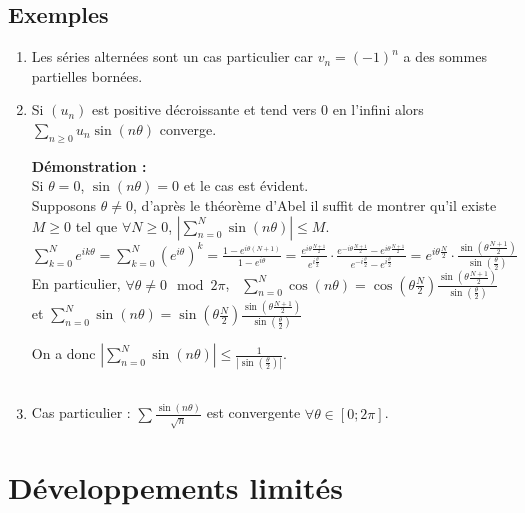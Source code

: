 \documentclass[a4paper,10pt]{book} %
\newcommand{\abs}[1]{\left|#1\right|}
\newcommand{\displayAmath}{\displaystyle}
\begin{document}
\subsection{Exemples}
\begin{enumerate}
\item Les séries alternées sont un cas particulier car $v_n=(-1)^n$ a des sommes partielles bornées.\\

\item Si $(u_n)$ est positive décroissante et tend vers 0 en l'infini alors $\displayAmath \sum_{n\geq 0}u_n\sin(n\theta)$ converge.

\textbf{Démonstration : }\\
Si $\theta=0$, $\sin(n\theta)=0$ et le cas est évident.\\

Supposons $\theta\neq 0$, d'après le théorème d'Abel il suffit de montrer qu'il existe $M\geq 0$ tel que $\forall N\geq 0$, $\displayAmath \abs{\sum_{n=0}^N\sin(n\theta)}\leq M$.\\
$\displayAmath \sum_{k=0}^N e^{ik\theta}=\sum_{k=0}^N(e^{i\theta})^k=\frac{1-e^{i\theta(N+1)}}{1-e^{i\theta}}=\frac{e^{i\theta\frac{N+1}{2}}}{e^{i\frac{\theta}{2}}}\cdot \frac{e^{-i\theta\frac{N+1}{2}}-e^{i\theta\frac{N+1}{2}}}{e^{-i\frac{\theta}{2}}-e^{i\frac{\theta}{2}}}=e^{i\theta\frac{N}{2}}\cdot \frac{\sin(\theta\frac{N+1}{2})}{\sin(\frac{\theta}{2})}$\\

En particulier, $\forall \theta\neq 0\mod 2\pi$,~ $\displayAmath \sum_{n=0}^N\cos(n\theta)=\cos(\theta\frac{N}{2})\frac{\sin(\theta\frac{N+1}{2})}{\sin(\frac{\theta}{2})}$ et $\displayAmath\sum_{n=0}^N\sin(n\theta)=\sin(\theta\frac{N}{2})\frac{\sin(\theta\frac{N+1}{2})}{\sin(\frac{\theta}{2})}$

On a donc $\displayAmath \abs{\sum_{n=0}^N\sin(n\theta)}\leq \frac{1}{\abs{\sin(\frac{\theta}{2})}}$.\\\\

\item Cas particulier : $\displayAmath \sum\frac{\sin(n\theta)}{\sqrt{n}}$ est convergente $\forall \theta\in[0;2\pi]$.
\end{enumerate}

\newpage

\section{Développements limités}
\end{document}
